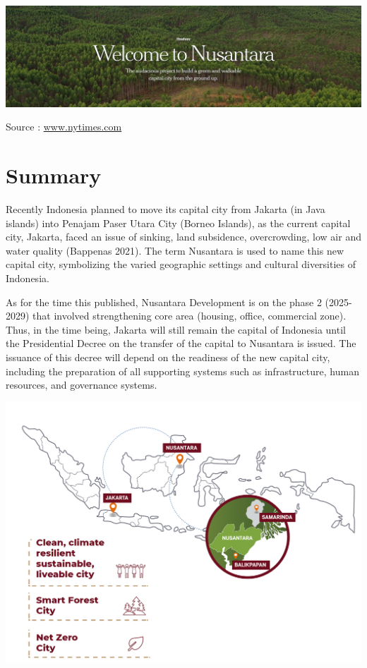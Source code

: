 \documentclass[
  letterpaper,
  DIV=11,
  numbers=noendperiod]{scrreprt}
\begin{document}
\includegraphics[width=9.82292in,height=\textheight]{images/clipboard-546673402.png}

Source :
\href{https://www.nytimes.com/interactive/2023/05/16/headway/indonesia-nusantara-jakarta.html}{www.nytimes.com}

\hypertarget{summary-3}{%
\section{Summary}\label{summary-3}}

Recently Indonesia planned to move its capital city from Jakarta (in
Java islands) into Penajam Paser Utara City (Borneo Islands), as the
current capital city, Jakarta, faced an issue of sinking, land
subsidence, overcrowding, low air and water quality (Bappenas 2021). The
term Nusantara is used to name this new capital city, symbolizing the
varied geographic settings and cultural diversities of Indonesia.

As for the time this published, Nusantara Development is on the phase 2
(2025-2029) that involved strengthening core area (housing, office,
commercial zone). Thus, in the time being, Jakarta will still remain the
capital of Indonesia until the Presidential Decree on the transfer of
the capital to Nusantara is issued. The issuance of this decree will
depend on the readiness of the new capital city, including the
preparation of all supporting systems such as infrastructure, human
resources, and governance systems.

\includegraphics[width=6.07292in,height=\textheight]{images/clipboard-3462147358.png}
\end{document}
